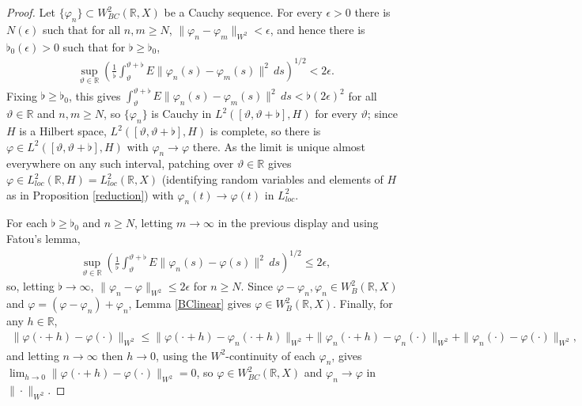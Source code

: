 \documentclass[10pt,a4paper]{amsart}
\begin{document}
\begin{proof}
Let $\{\varphi_n\}\subset W^2_{BC}(\mathbb R,X)$ be a Cauchy sequence. For every $\epsilon>0$ there is $N(\epsilon)$ such that for all $n,m\ge N$, $\|\varphi_n-\varphi_m\|_{W^2}<\epsilon$, and hence there is $\flat_0(\epsilon)>0$ such that for $\flat\ge\flat_0$,
\begin{align*}
\sup_{\vartheta\in\mathbb R}\left(\frac1\flat\int_\vartheta^{\vartheta+\flat}E\|\varphi_n(s)-\varphi_m(s)\|^2\,ds\right)^{1/2}<2\epsilon.
\end{align*}
Fixing $\flat\ge\flat_0$, this gives $\int_\vartheta^{\vartheta+\flat}E\|\varphi_n(s)-\varphi_m(s)\|^2\,ds<\flat(2\epsilon)^2$ for all $\vartheta\in\mathbb R$ and $n,m\ge N$, so $\{\varphi_n\}$ is Cauchy in $L^2([\vartheta,\vartheta+\flat],H)$ for every $\vartheta$; since $H$ is a Hilbert space, $L^2([\vartheta,\vartheta+\flat],H)$ is complete, so there is $\varphi\in L^2([\vartheta,\vartheta+\flat],H)$ with $\varphi_n\to\varphi$ there. As the limit is unique almost everywhere on any such interval, patching over $\vartheta\in\mathbb R$ gives $\varphi\in L^2_{loc}(\mathbb R,H)=L^2_{loc}(\mathbb R,X)$ (identifying random variables and elements of $H$ as in Proposition \ref{reduction}) with $\varphi_n(t)\to\varphi(t)$ in $L^2_{loc}$.

For each $\flat\ge\flat_0$ and $n\ge N$, letting $m\to\infty$ in the previous display and using Fatou's lemma,
\begin{align*}
\sup_{\vartheta\in\mathbb R}\left(\frac1\flat\int_\vartheta^{\vartheta+\flat}E\|\varphi_n(s)-\varphi(s)\|^2\,ds\right)^{1/2}\le2\epsilon,
\end{align*}
so, letting $\flat\to\infty$, $\|\varphi_n-\varphi\|_{W^2}\le2\epsilon$ for $n\ge N$. Since $\varphi-\varphi_n,\varphi_n\in W^2_B(\mathbb R,X)$ and $\varphi=(\varphi-\varphi_n)+\varphi_n$, Lemma \ref{BClinear} gives $\varphi\in W^2_B(\mathbb R,X)$. Finally, for any $h\in\mathbb R$,
\begin{align*}
\|\varphi(\cdot+h)-\varphi(\cdot)\|_{W^2}\le\|\varphi(\cdot+h)-\varphi_n(\cdot+h)\|_{W^2}+\|\varphi_n(\cdot+h)-\varphi_n(\cdot)\|_{W^2}+\|\varphi_n(\cdot)-\varphi(\cdot)\|_{W^2},
\end{align*}
and letting $n\to\infty$ then $h\to0$, using the $W^2$-continuity of each $\varphi_n$, gives $\lim_{h\to0}\|\varphi(\cdot+h)-\varphi(\cdot)\|_{W^2}=0$, so $\varphi\in W^2_{BC}(\mathbb R,X)$ and $\varphi_n\to\varphi$ in $\|\cdot\|_{W^2}$.
\end{proof}
\end{document}
